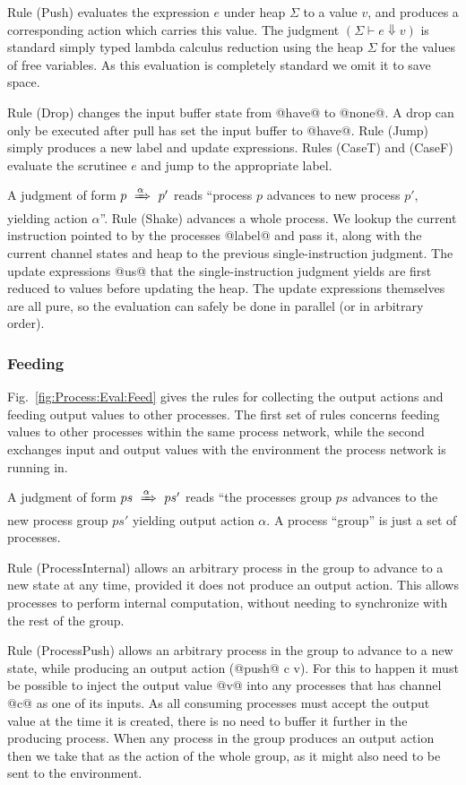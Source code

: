 Rule (Push) evaluates the expression $e$ under heap $\Sigma$ to a value $v$, and produces a corresponding action which carries this value. The judgment $(\Sigma \vdash e \Downarrow v)$ is standard simply typed lambda calculus reduction using the heap $\Sigma$ for the values of free variables. As this evaluation is completely standard we omit it to save space.

Rule (Drop) changes the input buffer state from @have@ to @none@. A drop can only be executed after pull has set the input buffer to @have@. Rule (Jump) simply produces a new label and update expressions. Rules (CaseT) and (CaseF) evaluate the scrutinee $e$ and jump to the appropriate label.

A judgment of form $p~\xRightarrow{\alpha}~p'$ reads ``process $p$ advances to new process $p'$, yielding action $\alpha$''. Rule (Shake) advances a whole process. We lookup the current instruction pointed to by the processes @label@ and pass it, along with the current channel states and heap to the previous single-instruction judgment. The update expressions @us@ that the single-instruction judgment yields are first reduced to values before updating the heap. The update expressions themselves are all pure, so the evaluation can safely be done in parallel (or in arbitrary order).


\subsubsection{Feeding}
Fig.~\ref{fig:Process:Eval:Feed} gives the rules for collecting the output actions and feeding output values to other processes. The first set of rules concerns feeding values to other processes within the same process network, while the second exchanges input and output values with the environment the process network is running in.

\eject{}
A judgment of form $ps~\xRightarrow{\alpha}~ps'$ reads ``the processes group $ps$ advances to the new process group $ps'$ yielding output action $\alpha$. A process ``group'' is just a set of processes. 

Rule (ProcessInternal) allows an arbitrary process in the group to advance to a new state at any time, provided it does not produce an output action. This allows processes to perform internal computation, without needing to synchronize with the rest of the group.

Rule (ProcessPush) allows an arbitrary process in the group to advance to a new state, while producing an output action (@push@ c v). For this to happen it must be possible to inject the output value @v@ into any processes that has channel @c@ as one of its inputs. As all consuming processes must accept the output value at the time it is created, there is no need to buffer it further in the producing process. When any process in the group produces an output action then we take that as the action of the whole group, as it might also need to be sent to the environment. 

